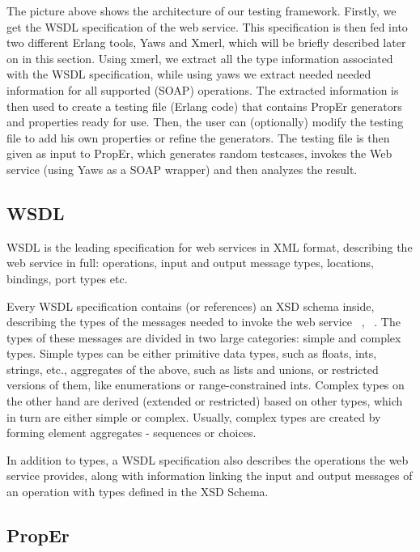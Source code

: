 \documentclass[submission,copyright,a4]{eptcs}
\begin{document}
The picture above shows the architecture of our testing framework. Firstly, we 
get the WSDL specification of the web service. This specification is then fed 
into two different Erlang tools, Yaws and Xmerl, which will be briefly described 
later on in this section. Using xmerl, we extract all the type information 
associated with the WSDL specification, while using yaws we extract needed 
needed information for all supported (SOAP) operations. The extracted information 
is then used to create a testing file (Erlang code) that contains PropEr generators 
and properties ready for use. Then, the user can (optionally) modify the testing 
file to add his own properties or refine the generators. The testing file is then 
given as input to PropEr, which generates random testcases, invokes the Web service 
(using Yaws as a SOAP wrapper) and then analyzes the result.

\subsection{WSDL}

WSDL is the leading specification for web services in XML format, describing the 
web service in full: operations, input and output message types, locations, 
bindings, port types etc. ~\cite{wsdl_spec}

Every WSDL specification contains (or references) an XSD schema inside, 
describing the types of the messages needed to invoke the web service 
~\cite{xsd_structure_spec}, ~\cite{xsd_datatypes_spec}. The 
types of these messages are divided in two large categories: simple and complex 
types. Simple types can be either primitive data types, such as floats, ints, 
strings, etc., aggregates of the above, such as lists and unions, or restricted 
versions of them, like enumerations or range-constrained ints. Complex types on 
the other hand are derived (extended or restricted) based on other types, which 
in turn are either simple or complex. Usually, complex types are created by 
forming element aggregates - sequences or choices. 

In addition to types, a WSDL specification also describes the operations the 
web service provides, along with information linking the input and output 
messages of an operation with types defined in the XSD Schema. 

\subsection{PropEr}
\end{document}
